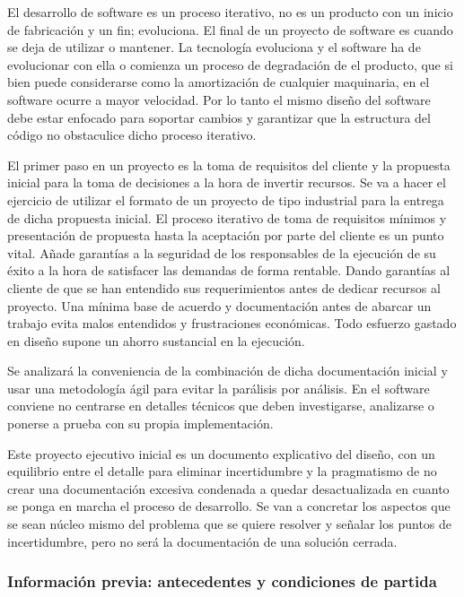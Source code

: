El desarrollo de software es un proceso iterativo, no es un producto con un inicio de fabricación y un fin; evoluciona.
El final de un proyecto de software es cuando se deja de utilizar o mantener.
La tecnología evoluciona y el software ha de evolucionar con ella o comienza un proceso de degradación de el producto, que si bien puede considerarse como la amortización de cualquier maquinaria, en el software ocurre a mayor velocidad.
Por lo tanto el mismo diseño del software debe estar enfocado para soportar cambios y garantizar que la estructura del código no obstaculice dicho proceso iterativo.

El primer paso en un proyecto es la toma de requisitos del cliente y la propuesta inicial para la toma de decisiones a la hora de invertir recursos.
Se va a hacer el ejercicio de utilizar el formato de un proyecto de tipo industrial para la entrega de dicha propuesta inicial.
El proceso iterativo de toma de requisitos mínimos y presentación de propuesta hasta la aceptación por parte del cliente es un punto vital.
Añade garantías a la seguridad de los responsables de la ejecución de su éxito a la hora de satisfacer las demandas de forma rentable.
Dando garantías al cliente de que se han entendido sus requerimientos antes de dedicar recursos al proyecto.
Una mínima base de acuerdo y documentación antes de abarcar un trabajo evita malos entendidos y frustraciones económicas.
Todo esfuerzo gastado en diseño supone un ahorro sustancial en la ejecución.

Se analizará la conveniencia de la combinación de dicha documentación inicial y usar una metodología ágil para evitar la parálisis por análisis.
En el software conviene no centrarse en detalles técnicos que deben investigarse, analizarse o ponerse a prueba con su propia implementación.

Este proyecto ejecutivo inicial es un documento explicativo del diseño, con un equilibrio entre el detalle para eliminar incertidumbre y la pragmatismo de no crear una documentación excesiva condenada a quedar desactualizada en cuanto se ponga en marcha el proceso de desarrollo.
Se van a concretar los aspectos que se sean núcleo mismo del problema que se quiere resolver y señalar los puntos de incertidumbre, pero no será la documentación de una solución cerrada.

\subsubsection{Información previa: antecedentes y condiciones de partida}

